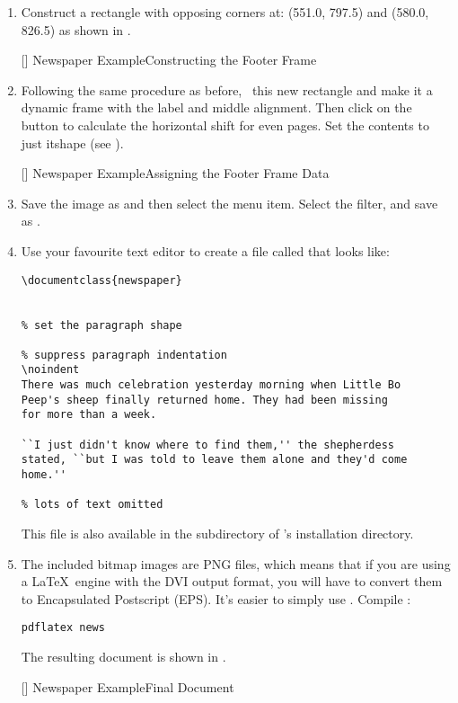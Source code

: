 \begin{enumerate}
[]
{}
{Newspaper Example\dash Setting the Early Preamble Code}

[]
{}
{Newspaper Example\dash Setting the Late Preamble Code}

\item Construct a rectangle with opposing corners at: (551.0, 797.5)
and (580.0, 826.5) as shown in .

[]
{}
{Newspaper Example\dash Constructing the Footer Frame}

\item Following the same procedure as before, \select\ this new
rectangle and make it a dynamic frame with the label
 and middle alignment. Then click on the
 button to calculate the
horizontal shift for even pages. Set the contents to just
\gls{itshape} (see ).

[]
{}
{Newspaper Example\dash Assigning the Footer Frame Data}

\item Save the image as  and then select the
 menu item. Select the
 filter, and save as
.

\item Use your favourite text editor to create a file called
 that looks like:
\begin{verbatim}
\documentclass{newspaper}


% set the paragraph shape

% suppress paragraph indentation
\noindent
There was much celebration yesterday morning when Little Bo
Peep's sheep finally returned home. They had been missing
for more than a week.

``I just didn't know where to find them,'' the shepherdess
stated, ``but I was told to leave them alone and they'd come
home.''

% lots of text omitted

\end{verbatim}
This file is also available in the  subdirectory
of \FlowframTk's installation directory.

\item The included \gls{bitmap} images are PNG files, which means that if you
are using a \LaTeX\ engine with the DVI output format, you will have to convert them
to Encapsulated Postscript (EPS). It's easier to simply use
\pdfLaTeX. Compile :
\begin{verbatim}
pdflatex news
\end{verbatim}
The resulting document is shown in .

[]
{}
{Newspaper Example\dash Final Document}

\end{enumerate}

